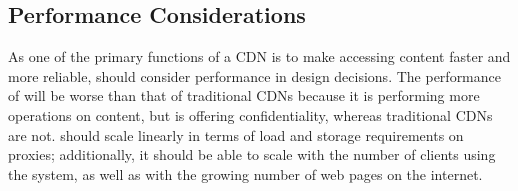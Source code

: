 \subsection{Performance Considerations}
As one of the primary functions of a CDN is to make accessing content faster and more 
reliable, \system{} should consider performance in design decisions.  The performance of \system{} will 
be worse than that of traditional CDNs because it is performing more operations on content, but \system{} 
is offering confidentiality, whereas traditional CDNs are not.  \system{} should scale linearly in terms of load 
and storage requirements on proxies; additionally, it should be able to 
scale with the number of clients using the system, as well as with the growing number of web pages on the internet.

